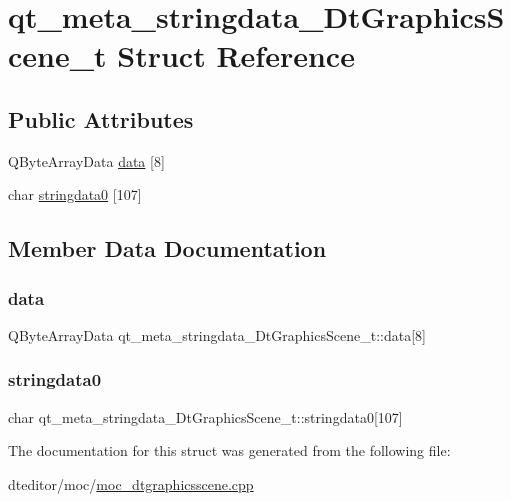 \hypertarget{structqt__meta__stringdata___dt_graphics_scene__t}{}\section{qt\+\_\+meta\+\_\+stringdata\+\_\+\+Dt\+Graphics\+Scene\+\_\+t Struct Reference}
\label{structqt__meta__stringdata___dt_graphics_scene__t}
\subsection*{Public Attributes}
\begin{DoxyCompactItemize}
\item 
Q\+Byte\+Array\+Data \mbox{\hyperlink{structqt__meta__stringdata___dt_graphics_scene__t_a60bb2572890e5fa99312654fbd59e8e6}{data}} \mbox{[}8\mbox{]}
\item 
char \mbox{\hyperlink{structqt__meta__stringdata___dt_graphics_scene__t_afa2de162fc24b1a940b215b9d136ee41}{stringdata0}} \mbox{[}107\mbox{]}
\end{DoxyCompactItemize}


\subsection{Member Data Documentation}
\mbox{\label{structqt__meta__stringdata___dt_graphics_scene__t_a60bb2572890e5fa99312654fbd59e8e6}} 
\subsubsection{\texorpdfstring{data}{data}}
{\footnotesize\ttfamily Q\+Byte\+Array\+Data qt\+\_\+meta\+\_\+stringdata\+\_\+\+Dt\+Graphics\+Scene\+\_\+t\+::data\mbox{[}8\mbox{]}}

\mbox{\label{structqt__meta__stringdata___dt_graphics_scene__t_afa2de162fc24b1a940b215b9d136ee41}} 
\subsubsection{\texorpdfstring{stringdata0}{stringdata0}}
{\footnotesize\ttfamily char qt\+\_\+meta\+\_\+stringdata\+\_\+\+Dt\+Graphics\+Scene\+\_\+t\+::stringdata0\mbox{[}107\mbox{]}}



The documentation for this struct was generated from the following file\+:\begin{DoxyCompactItemize}
\item 
dteditor/moc/\mbox{\hyperlink{moc__dtgraphicsscene_8cpp}{moc\+\_\+dtgraphicsscene.\+cpp}}\end{DoxyCompactItemize}
